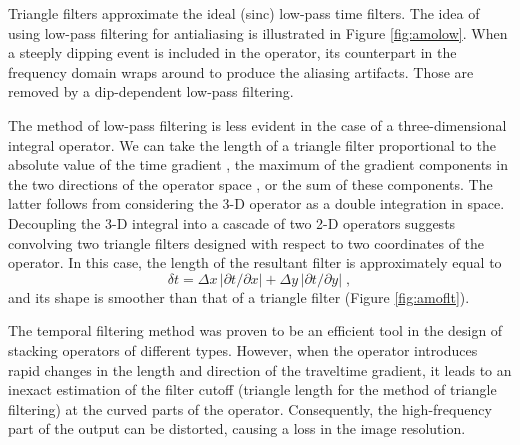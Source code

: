 Triangle filters approximate the ideal (sinc) low-pass time filters.
The idea of using low-pass filtering for antialiasing
\cite[]{GPR40-05-05650572} is illustrated in Figure \ref{fig:amolow}.
When a steeply dipping event is included in the operator, its
counterpart in the frequency domain wraps around to produce the
aliasing artifacts. Those are removed by a dip-dependent low-pass
filtering.



The method of low-pass filtering is less evident in the case of a
three-dimensional integral operator. We can take the length of a
triangle filter proportional to the absolute value of the time
gradient \cite[]{SEG-1994-1282}, the maximum of the gradient
components in the two directions of the operator space
\cite[]{GEO64-06-17831792}, or the sum of these components. The latter
follows from considering the 3-D operator as a double integration in
space. Decoupling the 3-D integral into a cascade of two 2-D operators
suggests convolving two triangle filters designed with respect to two
coordinates of the operator. In this case, the length of the resultant
filter is approximately equal to
\begin{equation}
\delta t =      \Delta x\,|\partial t / \partial x| + 
                \Delta y\,|\partial t / \partial y|\;,
\label{eqn:dt3}
\end{equation}
and its shape is smoother than that of a triangle filter (Figure
\ref{fig:amoflt}).


The temporal filtering method was proven to be an efficient tool in
the design of stacking operators of different types. However, when the
operator introduces rapid changes in the length and direction of the
traveltime gradient, it leads to an inexact estimation of the filter
cutoff (triangle length for the method of triangle filtering) at the
curved parts of the operator. Consequently, the high-frequency part of
the output can be distorted, causing a loss in the image resolution.

